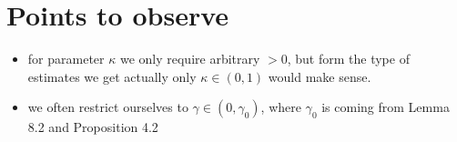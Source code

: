 \documentclass{report}
\theoremstyle{remark}
\theoremstyle{definition}
\begin{document}
\section{Points to observe}
\begin{itemize}
  \item for parameter $\kappa$ we only require arbitrary $> 0$, but form the type of estimates we get actually only $\kappa \in (0, 1)$ would make sense.
  \item we often restrict ourselves to $\gamma \in (0, \gamma_0)$, where $\gamma_0$ is coming from Lemma 8.2 and Proposition 4.2
\end{itemize}

\newpage
\printbibliography
\end{document}
